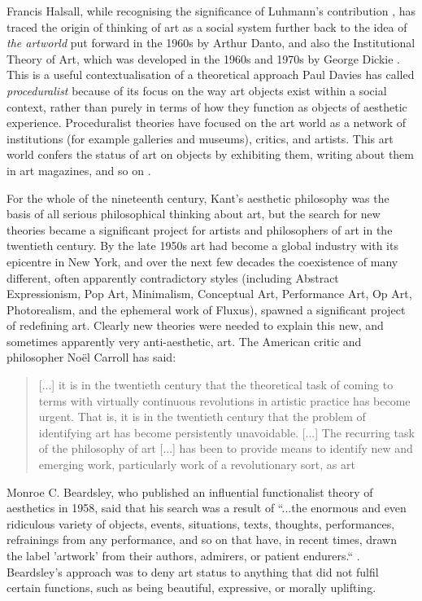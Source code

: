         Francis Halsall, while recognising the significance of Luhmann's contribution \citep[pp.57-59]{HalsallSystmsOfArt2008}, has traced the origin of thinking of art as a social system further back to the idea of \emph{the artworld} put forward in the 1960s by Arthur Danto, and also the Institutional Theory of Art, which was developed in the 1960s and 1970s by George Dickie \citep[pp.67-74]{HalsallSystmsOfArt2008}. This is a useful contextualisation of a theoretical approach Paul Davies has called \emph{proceduralist} because of its focus on the way art objects exist within a social context, rather than purely in terms of how they function as objects of aesthetic experience. Proceduralist theories have focused on the art world as a network of institutions (for example galleries and museums), critics, and artists. This art world confers the status of art on objects by exhibiting them, writing about them in art magazines, and so on \citep[pp.36-37]{DaviesThPhlsphyOfArt2016}.

        For the whole of the nineteenth century, Kant's aesthetic philosophy was the basis of all serious philosophical thinking about art, but the search for new theories became a significant project for artists and philosophers of art in the twentieth century. By the late 1950s art had become a global industry with its epicentre in New York, and over the next few decades the coexistence of many different, often apparently contradictory styles (including Abstract Expressionism, Pop Art, Minimalism, Conceptual Art, Performance Art, Op Art, Photorealism, and the ephemeral work of Fluxus), spawned a significant project of redefining art. Clearly new theories were needed to explain this new, and sometimes apparently very anti-aesthetic, art. The American critic and philosopher Noël Carroll has said:

        \begin{quote}
            [...] it is in the twentieth century that the theoretical task of coming to terms with virtually continuous revolutions in artistic practice has become urgent. That is, it is in the twentieth century that the problem of identifying art has become persistently unavoidable. [...] The recurring task of the philosophy of art [...] has been to provide means to identify new and emerging work, particularly work of a revolutionary sort, as art\citep[pp.101-102]{CarrollHstrclNrrtvs2001}
        \end{quote}

        Monroe C. Beardsley, who published an influential functionalist theory of aesthetics in 1958, said that his search was a result of “...the enormous and even ridiculous variety of objects, events, situations, texts, thoughts, performances, refrainings from any performance, and so on that have, in recent times, drawn the label 'artwork' from their authors, admirers, or patient endurers.“ \citep[p.?]{BeardsleyAesthetics1958}. Beardsley's approach was to deny art status to anything that did not fulfil certain functions, such as being beautiful, expressive, or morally uplifting.

